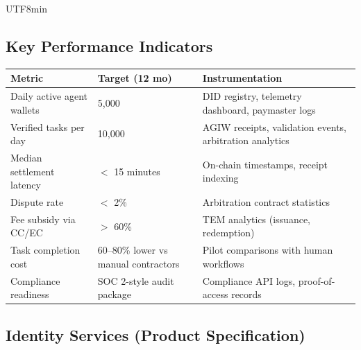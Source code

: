 \documentclass[11pt]{article}
\begin{document}
\begin{CJK}{UTF8}{min}
\subsection{Key Performance Indicators}
\begin{longtable}{@{}p{}p{}p{}@{}}
\toprule
\textbf{Metric} & \textbf{Target (12 mo)} & \textbf{Instrumentation} \\\midrule
Daily active agent wallets & 5,000 & DID registry, telemetry dashboard, paymaster logs \\
Verified tasks per day & 10,000 & AGIW receipts, validation events, arbitration analytics \\
Median settlement latency & $<$ 15 minutes & On-chain timestamps, receipt indexing \\
Dispute rate & $<$ 2\% & Arbitration contract statistics \\
Fee subsidy via CC/EC & $>$ 60\% & TEM analytics (issuance, redemption) \\
Task completion cost & 60--80\% lower vs manual contractors & Pilot comparisons with human workflows \\
Compliance readiness & SOC 2-style audit package & Compliance API logs, proof-of-access records \\
\bottomrule
\end{longtable}

\subsection{Identity Services (Product Specification)}
\label{sec:identity-spec}

\end{CJK}
\end{document}
